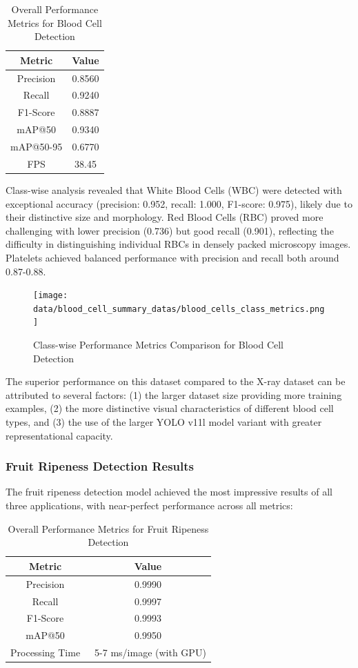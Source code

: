 \begin{multicols}{2}
\begin{table}[h]
\centering
\begin{tabular}{|c|c|}
\hline
\textbf{Metric} & \textbf{Value} \\
\hline
Precision & 0.8560 \\
Recall & 0.9240 \\
F1-Score & 0.8887 \\
mAP@50 & 0.9340 \\
mAP@50-95 & 0.6770 \\
FPS & 38.45 \\
\hline
\end{tabular}
\caption{Overall Performance Metrics for Blood Cell Detection}
\label{tab:blood_cell_results}
\end{table}

Class-wise analysis revealed that White Blood Cells (WBC) were detected with exceptional accuracy (precision: 0.952, recall: 1.000, F1-score: 0.975), likely due to their distinctive size and morphology. Red Blood Cells (RBC) proved more challenging with lower precision (0.736) but good recall (0.901), reflecting the difficulty in distinguishing individual RBCs in densely packed microscopy images. Platelets achieved balanced performance with precision and recall both around 0.87-0.88.

\begin{figure}[h]
\centering
\texttt{[image: data/blood\_cell\_summary\_datas/blood\_cells\_class\_metrics.png]}
\caption{Class-wise Performance Metrics Comparison for Blood Cell Detection}
\label{fig:blood_cell_class_metrics}
\end{figure}

The superior performance on this dataset compared to the X-ray dataset can be attributed to several factors: (1) the larger dataset size providing more training examples, (2) the more distinctive visual characteristics of different blood cell types, and (3) the use of the larger YOLO v11l model variant with greater representational capacity.

\subsubsection{Fruit Ripeness Detection Results}

The fruit ripeness detection model achieved the most impressive results of all three applications, with near-perfect performance across all metrics:

\begin{table}[h]
\centering
\begin{tabular}{|c|c|}
\hline
\textbf{Metric} & \textbf{Value} \\
\hline
Precision & 0.9990 \\
Recall & 0.9997 \\
F1-Score & 0.9993 \\
mAP@50 & 0.9950 \\
Processing Time & ~5-7 ms/image (with GPU) \\
\hline
\end{tabular}
\caption{Overall Performance Metrics for Fruit Ripeness Detection}
\label{tab:fruit_results}
\end{table}


\end{multicols}
